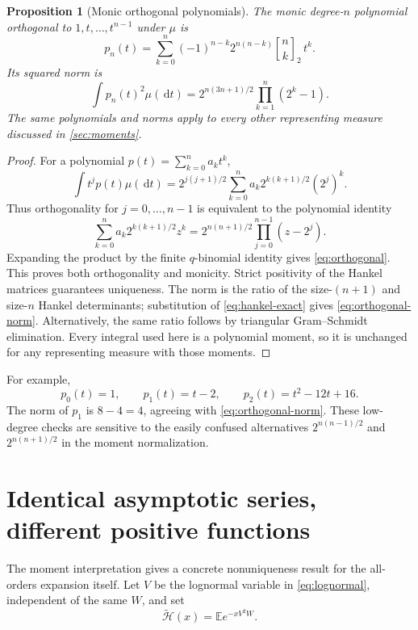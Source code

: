 \documentclass[11pt,a4paper]{article}
\numberwithin{equation}{section}
\newtheorem{proposition}[proposition]{Proposition}
\theoremstyle{definition}
\theoremstyle{remark}
\newcommand{\E}{\mathbb E}
\newcommand{\dd}{\,\mathrm d}
\newcommand{\qbinom}[3]{\genfrac{[}{]}{0pt}{}{#1}{#2}_{#3}}
\newcommand{\calH}{\mathcal H}
\begin{document}
\begin{proposition}[Monic orthogonal polynomials]
\label{prop:orthogonal}
The monic degree-$n$ polynomial orthogonal to $1,t,\ldots,t^{n-1}$
under $\mu$ is
\begin{equation}
 \boxed{\displaystyle
 p_n(t)=\sum_{k=0}^n(-1)^{n-k}2^{n(n-k)}\qbinom nk2\,t^k.}
 \label{eq:orthogonal}
\end{equation}
Its squared norm is
\begin{equation}
 \int p_n(t)^2\mu(\dd t)
 =2^{n(3n+1)/2}\prod_{k=1}^n(2^k-1).
 \label{eq:orthogonal-norm}
\end{equation}
The same polynomials and norms apply to every other representing
measure discussed in \cref{sec:moments}.
\end{proposition}
\begin{proof}
For a polynomial $p(t)=\sum_{k=0}^na_kt^k$,
\[
 \int t^jp(t)\mu(\dd t)
 =2^{j(j+1)/2}\sum_{k=0}^n
        a_k2^{k(k+1)/2}(2^j)^k.
\]
Thus orthogonality for $j=0,\ldots,n-1$ is equivalent to the
polynomial identity
\[
 \sum_{k=0}^na_k2^{k(k+1)/2}z^k
 =2^{n(n+1)/2}\prod_{j=0}^{n-1}(z-2^j).
\]
Expanding the product by the finite $q$-binomial identity gives
\cref{eq:orthogonal}. This proves both orthogonality and monicity.
Strict positivity of the Hankel matrices guarantees uniqueness.
The norm is the ratio of the size-$(n+1)$ and size-$n$ Hankel
determinants; substitution of \cref{eq:hankel-exact} gives
\cref{eq:orthogonal-norm}. Alternatively, the same ratio follows
by triangular Gram--Schmidt elimination. Every integral used here
is a polynomial moment, so it is unchanged for any representing
measure with those moments.
\end{proof}

For example,
\[
 p_0(t)=1,\qquad p_1(t)=t-2,\qquad
 p_2(t)=t^2-12t+16.
\]
The norm of $p_1$ is $8-4=4$, agreeing with
\cref{eq:orthogonal-norm}. These low-degree checks are sensitive to
the easily confused alternatives $2^{n(n-1)/2}$ and
$2^{n(n+1)/2}$ in the moment normalization.

\section{Identical asymptotic series, different positive functions}
\label{sec:flat-twins}
The moment interpretation gives a concrete nonuniqueness result for
the all-orders expansion itself. Let $V$ be the lognormal variable
in \cref{eq:lognormal}, independent of the same $W$, and set
\begin{equation}
 \widetilde{\calH}(x)=\E e^{-xV^2W}.
 \label{eq:Htilde}
\end{equation}
\end{document}
